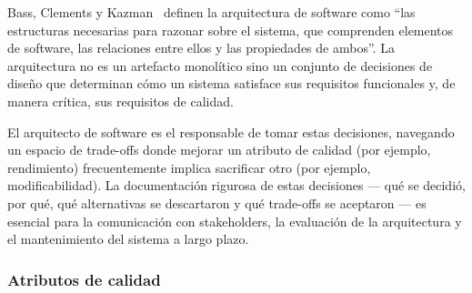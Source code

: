 \documentclass[12pt, letterpaper, oneside]{article}
\begin{document}

Bass, Clements y Kazman~\cite{bass2021software} definen la arquitectura de
software como ``las estructuras necesarias para razonar sobre el sistema, que
comprenden elementos de software, las relaciones entre ellos y las propiedades de
ambos''. La arquitectura no es un artefacto monolítico sino un conjunto de
decisiones de diseño que determinan cómo un sistema satisface sus requisitos
funcionales y, de manera crítica, sus requisitos de calidad.

El arquitecto de software es el responsable de tomar estas decisiones, navegando
un espacio de trade-offs donde mejorar un atributo de calidad (por ejemplo,
rendimiento) frecuentemente implica sacrificar otro (por ejemplo, modificabilidad).
La documentación rigurosa de estas decisiones --- qué se decidió, por qué, qué
alternativas se descartaron y qué trade-offs se aceptaron --- es esencial para la
comunicación con stakeholders, la evaluación de la arquitectura y el mantenimiento
del sistema a largo plazo.

\subsubsection{Atributos de calidad}
\end{document}
